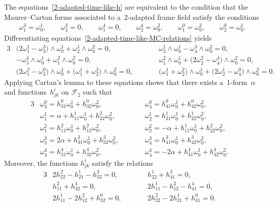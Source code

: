 \documentclass[pdftex]{sigma}
\numberwithin{equation}{section}
\theoremstyle{definition}
\begin{document}
The equations~\eqref{2-adapted-time-like-h} are equivalent to the condition that the Maurer--Cartan forms associated to
a~2-adapted frame f\/ield satisfy the conditions
\begin{gather}
\omega^3_1=\omega^1_0,
\qquad
\omega^3_2=0,
\qquad
\omega^4_1=0,
\qquad
\omega^4_2=\omega^2_0,
\qquad
\omega^0_1=\omega^2_0,
\qquad
\omega^0_2=\omega^1_0.
\label{2-adapted-time-like-MC-relations}
\end{gather}
Dif\/ferentiating equations~\eqref{2-adapted-time-like-MC-relations} yields
\begin{alignat*}{3}
& \big(2\omega^1_1 - \omega^3_3\big) \wedge \omega^1_0 + \omega^1_2 \wedge \omega^2_0 = 0,
\qquad &&
\omega^1_2 \wedge \omega^1_0 - \omega^3_4 \wedge \omega^2_0 = 0,&
\\
& -\omega^4_3 \wedge \omega^1_0 + \omega^2_1 \wedge \omega^2_0 = 0,
\qquad &&
\omega^2_1 \wedge \omega^1_0 + \big(2\omega^2_2 - \omega^4_4\big) \wedge \omega^2_0 = 0,&
\\
& \big(2\omega^2_1 - \omega^0_3\big) \wedge \omega^1_0 + \big(\omega^1_1 + \omega^2_2\big) \wedge \omega^2_0 = 0,
\qquad &&
\big(\omega^1_1 + \omega^2_2\big) \wedge \omega^1_0 + \big(2\omega^1_2 - \omega^0_4\big) \wedge \omega^2_0 = 0.&
\end{alignat*}
Applying Cartan's lemma to these equations shows that there exists a~1-form~$\alpha$ and func\-tions~$h^i_{jk}$ on
$\mathcal{F}_2$ such that
\begin{alignat}{3}
&\omega^0_3=h^0_{31}\omega^1_0 + h^0_{32}\omega^2_0,
\qquad&&
\omega^0_4=h^0_{41}\omega^1_0 + h^0_{42}\omega^2_0,&
\nonumber
\\
&\omega^1_1=\alpha + h^1_{11}\omega^1_0 + h^2_{22}\omega^2_0,
\qquad&&
\omega^1_2=h^1_{21}\omega^1_0 + h^1_{22}\omega^2_0,&
\nonumber
\\
&\omega^2_1=h^2_{11}\omega^1_0 + h^2_{12}\omega^2_0,
\qquad&&
\omega^2_2=-\alpha + h^1_{11}\omega^1_0 + h^2_{22}\omega^2_0,&
\nonumber
\\
&\omega^3_3=2\alpha + h^3_{31}\omega^1_0 + h^3_{32}\omega^2_0,
\qquad&&
\omega^3_4=h^3_{41}\omega^1_0 + h^3_{42}\omega^2_0,&
\nonumber
\\
&\omega^4_3=h^4_{31}\omega^1_0 + h^4_{32}\omega^2_0,
\qquad&&
\omega^4_4=-2\alpha + h^4_{41}\omega^1_0 + h^4_{42}\omega^2_0.&
\label{2-adapted-time-like-MC-semi-basic-forms}
\end{alignat}
Moreover, the functions $h^i_{jk}$ satisfy the relations
\begin{alignat}{3}
& 2 h^2_{22} - h^1_{21} - h^3_{32} = 0,
\qquad &&
h^1_{22} + h^3_{41} = 0,&
\nonumber
\\
&h^2_{11} + h^4_{32} = 0,
\qquad &&
2 h^1_{11} - h^2_{12} - h^4_{41} = 0,&
\nonumber
\\
& 2 h^1_{11} - 2 h^2_{12} + h^0_{32} = 0,
\qquad &&
2 h^2_{22} - 2 h^1_{21} + h^0_{41} = 0.&
\label{2-adapted-time-like-h-relations}
\end{alignat}
\end{document}
